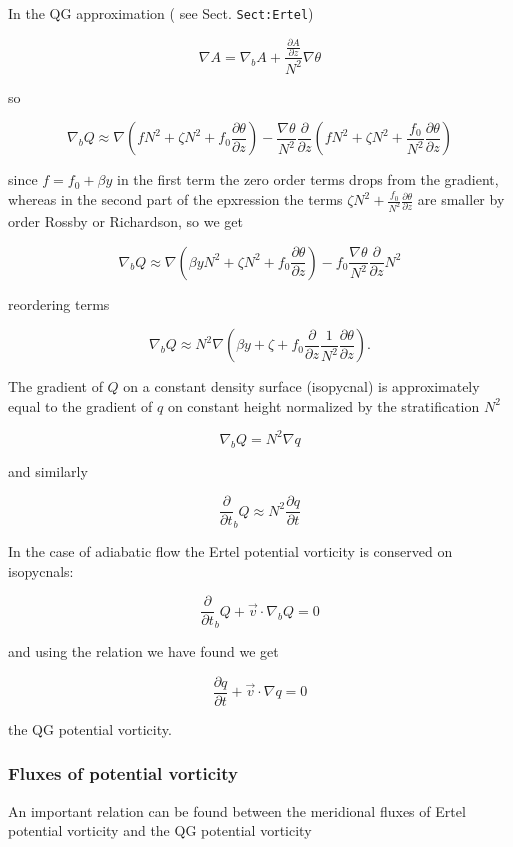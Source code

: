 In the QG approximation ( see Sect. \texttt{Sect:Ertel})

\[\nabla A = \nabla_b A + \frac{\frac{\partial A}{\partial z}}{N^2} \nabla \theta\]

so

\[\nabla_b Q \approx \nabla\left( f N^2 + \zeta N^2 + f_0 \frac{\partial \theta}{\partial z}\right) -\frac{\nabla\theta}{N^2}\frac{\partial }{\partial z}\left( fN^2 + \zeta N^2 + \frac{f_0}{N^2}\frac{\partial \theta}{\partial z}\right)\]

since \(f = f_0 + \beta y\) in the first term the zero order terms drops
from the gradient, whereas in the second part of the epxression the
terms \(\zeta N^2 + \frac{f_0}{N^2}\frac{\partial \theta}{\partial z}\)
are smaller by order Rossby or Richardson, so we get

\[\nabla_b Q \approx \nabla\left( \beta y N^2 + \zeta N^2 + f_0 \frac{\partial \theta}{\partial z}\right) -f_0 \frac{\nabla\theta}{N^2}\frac{\partial }{\partial z}N^2\]

reordering terms

\[\nabla_b Q \approx N^2 \nabla\left( \beta y + \zeta  + f_0 \frac{\partial }{\partial z} \frac{1}{N^2} \frac{\partial \theta}{\partial z}\right).\]

The gradient of \(Q\) on a constant density surface (isopycnal) is
approximately equal to the gradient of \(q\) on constant height
normalized by the stratification \(N^2\)

\[\nabla_b Q = N^2 \nabla q\]

and similarly

\[\frac{\partial }{\partial t}_b Q \approx N^2 \frac{\partial q}{\partial t}\]

In the case of adiabatic flow the Ertel potential vorticity is conserved
on isopycnals:

\[\frac{\partial }{\partial t}_b Q + \vec{v}\cdot\nabla_b Q = 0\]

and using the relation we have found we get

\[\frac{\partial q}{\partial t} + \vec{v}\cdot\nabla q = 0\]

the QG potential vorticity.

\subsubsection{Fluxes of potential
vorticity}\label{fluxes-of-potential-vorticity}

An important relation can be found between the meridional fluxes of
Ertel potential vorticity and the QG potential vorticity

